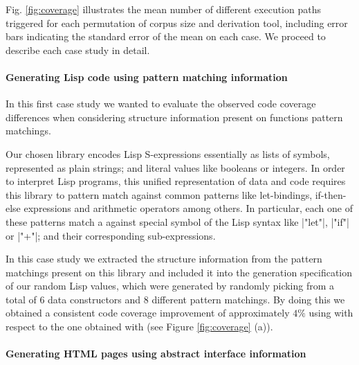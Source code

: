 \begin{figure*}[t]
  \centering
  
  \hspace{5pt}%
  
  \caption{Path coverage comparison between \dragen (\ref{exp:dragen}) and
    \dragenp (\ref{exp:dragenp}). }
  \label{fig:coverage}
\end{figure*}

Fig. \ref{fig:coverage} illustrates the mean number of different execution paths
triggered for each permutation of corpus size and derivation tool, including
error bars indicating the standard error of the mean on each case.
%
We proceed to describe each case study in detail.


\paragraph{Generating Lisp code using pattern matching information}

In this first case study we wanted to evaluate the observed code coverage
differences when considering structure information present on functions pattern
matchings.


Our chosen library encodes Lisp S-expressions essentially as lists of symbols,
represented as plain strings; and literal values like booleans or integers.
%
In order to interpret Lisp programs, this unified representation of data and
code requires this library to pattern match against common patterns like
let-bindings, if-then-else expressions and arithmetic operators among others.
%
In particular, each one of these patterns match a against special symbol of the
Lisp syntax like |"let"|, |"if"| or |"+"|; and their corresponding
sub-expressions.


In this case study we extracted the structure information from the pattern
matchings present on this library and included it into the generation
specification of our random Lisp values, which were generated by randomly
picking from a total of 6 data constructors and 8 different pattern matchings.
%
By doing this we obtained a consistent code coverage improvement of
approximately $4\%$ using \dragenp with respect to the one obtained with
\dragen (see Figure \ref{fig:coverage} (a)).
%

\paragraph{Generating HTML pages using abstract interface information}


